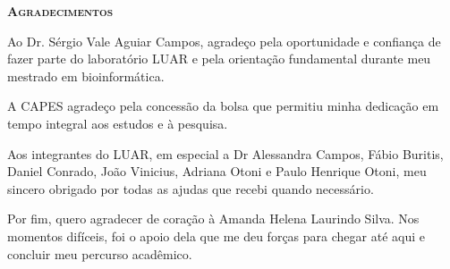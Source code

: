 \documentclass[12pt]{article}
\begin{document}
    \begin{titlepage}
        {\center \textsc{\fontsize{16}{16}\selectfont \textbf{Agradecimentos}} \\}
        \fontsize{12}{12}\selectfont

        \hspace{1cm}
        
        Ao Dr. Sérgio Vale Aguiar Campos, agradeço pela oportunidade e confiança de fazer parte do laboratório LUAR e pela orientação fundamental durante meu mestrado em bioinformática.

        A CAPES agradeço pela concessão da bolsa que permitiu minha dedicação em tempo integral aos estudos e à pesquisa.

        Aos integrantes do LUAR, em especial a Dr Alessandra Campos, Fábio Buritis, Daniel Conrado, João Vinicius, Adriana Otoni e Paulo Henrique Otoni, meu sincero obrigado por todas as ajudas que recebi quando necessário.

        Por fim, quero agradecer de coração à Amanda Helena Laurindo Silva. Nos momentos difíceis, foi o apoio dela que me deu forças para chegar até aqui e concluir meu percurso acadêmico.
        
    \end{titlepage}
    
    
    \newpage
    
    
    
    \tableofcontents
    \thispagestyle{empty}

    \newpage

    \setcounter{page}{10} %
    
    
    
    
    
    
    
    
    
    
    
    \newpage
    
    
    
    
\end{document}
